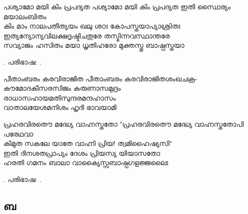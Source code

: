 \begin{enumerate}


\begin{slokam}{\VSv}{\Amar}{പശ്യാമോ മയി കിം പ്രപദ്യത}
  പശ്യാമോ മയി കിം പ്രപദ്യത ഇതി സ്ഥൈര്യം മയാലംബിതം  \\
  കിം മാം നാലപതീത്യയം ഖലു ശഠഃ കോപസ്തയാപ്യാശ്രിതഃ  \\
  ഇത്യന്യോന്യവിലക്ഷദൃഷ്ടിചതുരേ തസ്മിന്നവസ്ഥാന്തരേ  \\
  സവ്യാജം ഹസിതം മയാ ധൃതിഹരോ മുക്തസ്തു ബാഷ്പസ്തയാ
\end{slokam}


. പരിഭാഷ: .



\begin{slokam}{\VVt}{\Unk}{പീതാംബരം കരവിരാജിത}
പീതാംബരം കരവിരാജിതശംഖചക്ര-\\
കൗമോദകീസരസിജം കരുണാസമുദ്രം\\
രാധാസഹായമതിസുന്ദരമന്ദഹാസം\\
വാതാലയേശമനിശം ഹൃദി ഭാവയാമി
\end{slokam}



\begin{slokam}{\VHr}{\Amar}{പ്രഹരവിരതൌ മദ്ധ്യേ വാഹ്നസ്തതോ}
"പ്രഹരവിരതൌ മദ്ധ്യേ വാഹ്നസ്തതോ\prash{}പി പരേ\prash{}ഥവാ\\
കിമുത സകലേ യാതേ വാഹ്നി പ്രിയ! ത്വമിഹൈഷ്യസി"\\
ഇതി ദിനശതപ്രാപ്യം ദേശം പ്രിയസ്യ യിയാസതോ\\
ഹരതി ഗമനം ബാലാ വാക്യൈസ്സബാഷ്പഗളജ്ജലൈഃ
\end{slokam}


. പരിഭാഷ: .

\end{enumerate}

\subsection{ബ}


